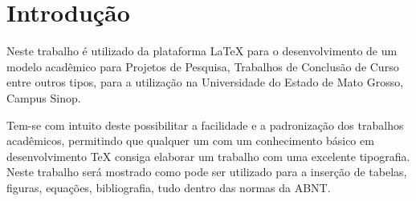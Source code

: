 \chapter*{Introdução}
Neste trabalho é utilizado da plataforma LaTeX para o desenvolvimento de um modelo acadêmico para Projetos de Pesquisa, Trabalhos de Conclusão de Curso entre outros tipos, para a utilização na Universidade do Estado de Mato Grosso, Campus Sinop.

Tem-se com intuito deste possibilitar a facilidade e a padronização dos trabalhos acadêmicos, permitindo que qualquer um com um conhecimento básico em desenvolvimento TeX consiga elaborar um trabalho com uma excelente tipografia. Neste trabalho será mostrado como pode ser utilizado para a inserção de tabelas, figuras, equações, bibliografia, tudo dentro das normas da ABNT.
